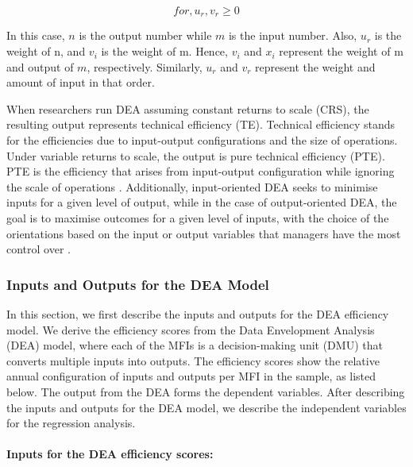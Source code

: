 \documentclass[a4paper, nobind]{templates/ociamthesis}
\begin{document}
\begin{equation}
for, u_{r}, v_{r} \geqslant 0
\end{equation}

In this case, \(n\) is the output number while \(m\) is the input number. Also, \(u_{r}\) is the weight of n, and \(v_{i}\) is the weight of m. Hence, \(v_{i}\) and \(x_{i}\) represent the weight of m and output of \(m\), respectively. Similarly, \(u_{r}\) and \(v_{r}\) represent the weight and amount of input in that order.

When researchers run DEA assuming constant returns to scale (CRS), the resulting output represents technical efficiency (TE). Technical efficiency stands for the efficiencies due to input-output configurations and the size of operations. Under variable returns to scale, the output is pure technical efficiency (PTE). PTE is the efficiency that arises from input-output configuration while ignoring the scale of operations \autocite{staub2010evolution,ulas2015performance}. Additionally, input-oriented DEA seeks to minimise inputs for a given level of output, while in the case of output-oriented DEA, the goal is to maximise outcomes for a given level of inputs, with the choice of the orientations based on the input or output variables that managers have the most control over \autocite{huguenin2012data}.

\hypertarget{inputs-and-outputs-for-the-dea-model}{%
\subsubsection{Inputs and Outputs for the DEA Model}\label{inputs-and-outputs-for-the-dea-model}}

In this section, we first describe the inputs and outputs for the DEA efficiency model. We derive the efficiency scores from the Data Envelopment Analysis (DEA) model, where each of the MFIs is a decision-making unit (DMU) that converts multiple inputs into outputs. The efficiency scores show the relative annual configuration of inputs and outputs per MFI in the sample, as listed below. The output from the DEA forms the dependent variables. After describing the inputs and outputs for the DEA model, we describe the independent variables for the regression analysis.

\hypertarget{inputs-for-the-dea-efficiency-scores}{%
\paragraph{Inputs for the DEA efficiency scores:}\label{inputs-for-the-dea-efficiency-scores}}
\end{document}
